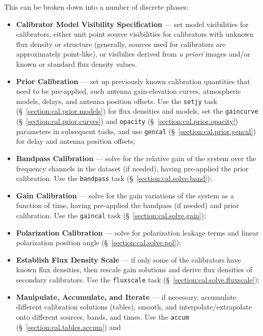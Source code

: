 This can be broken down into a number of discrete phases:
\begin{itemize}
   \item {\bf Calibrator Model Visibility Specification} --- set
      model visibilities for calibrators, either unit point source
      visibilities for calibrators with unknown flux density or
      structure (generally, sources used for calibrators are
      approximately point-like), or visibilies derived from {\em a
      priori} images and/or known or standard flux density values.
   \item {\bf Prior Calibration} --- set up previously known
      calibration quantities that need to be pre-applied, such
      antenna
      gain-elevation curves, atmospheric models, delays, and
      antenna position offsets. Use the
      {\tt setjy} task (\S~\ref{section:cal.prior.models}) for flux
      densities and models,
      set the {\tt gaincurve} (\S~\ref{section:cal.prior.curves})
      and {\tt opacity} (\S~\ref{section:cal.prior.opacity}) parameters 
      in subsequent tasks, and use {\tt gencal} (\S~\ref{section:cal.prior.gencal})
      for delay and antenna position offsets;
   \item {\bf Bandpass Calibration} --- solve
      for the relative gain of the system over the frequency channels 
      in the dataset (if needed), having pre-applied the prior
      calibration. Use the {\tt bandpass} task 
      (\S~\ref{section:cal.solve.band});
   \item {\bf Gain Calibration} --- solve for the gain variations of
      the system as a function of time, having pre-applied the 
      bandpass (if needed) and prior calibration. Use the 
      {\tt gaincal} task (\S~\ref{section:cal.solve.gain});
   \item {\bf Polarization Calibration} --- solve for 
      polarization leakage terms and linear polarization position angle
      (\S~\ref{section:cal.solve.pol});
   \item {\bf Establish Flux Density Scale} --- if only some of the
      calibrators have known flux densities, then rescale gain
      solutions and derive flux densities of secondary calibrators.
      Use the {\tt fluxscale} task (\S~\ref{section:cal.solve.fluxscale});
   \item {\bf Manipulate, Accumulate, and Iterate} --- if necessary,
      accumulate different calibration solutions (tables), smooth,
      and interpolate/extrapolate onto different sources, bands, and
      times. Use the {\tt accum} (\S~\ref{section:cal.tables.accum}) and

\end{itemize}
